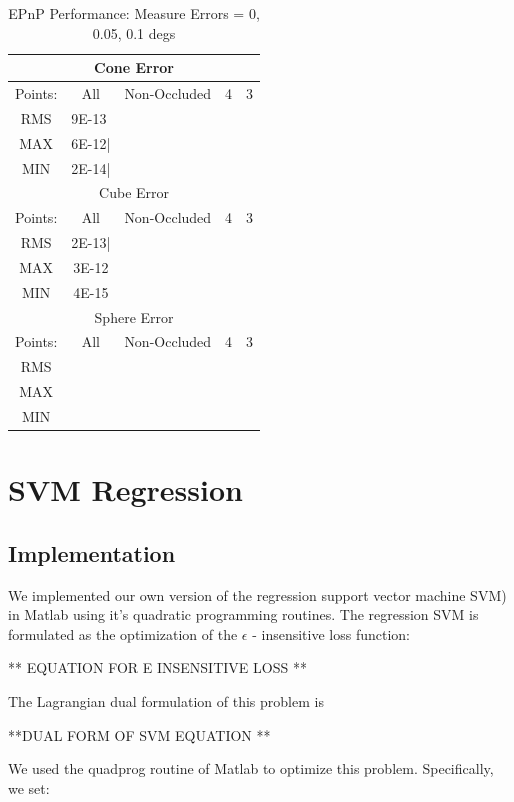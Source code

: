 \documentclass[journal]{IEEEtran}
\begin{document}
 

\begin{table}[h]
	\caption{EPnP Performance: Measure Errors = 0, 0.05, 0.1 degs }
	\label{EPnP_Table}
	\centering
	\begin{tabular}{|c|c|c|c|c|}
		
		\hline
		\multicolumn{5}{|c|}{Cone Error} \\
		\hline
		Points: & All & Non-Occluded & 4 & 3\\
		\hline
		RMS & \multicolumn{1}{|l|}{9E-13}  &  &  &\\
		MAX & 6E-12| & &  &\\
		MIN & 2E-14| & &  &\\
		\hline
		\multicolumn{5}{|c|}{Cube Error} \\
		\hline
		Points: & All & Non-Occluded & 4 & 3\\
		\hline
		RMS & 2E-13| &  &  &\\
		MAX & 3E-12 & &  &\\
		MIN & 4E-15 & &  &\\
		\hline
		\multicolumn{5}{|c|}{Sphere Error} \\
		\hline
		Points: & All & Non-Occluded & 4 & 3\\
		\hline
		RMS &  &  & &\\
		MAX &  & &  &\\
		MIN & & &  &\\
		\hline
		
		
	\end{tabular}
\end{table}

\section{SVM Regression}

\subsection{Implementation}
We implemented our own version of the regression support vector machine SVM) in Matlab using it's quadratic programming routines. The regression SVM is formulated as the optimization of the $\epsilon$ - insensitive loss function:

** EQUATION FOR E INSENSITIVE LOSS **

The Lagrangian dual formulation of this problem is

**DUAL FORM OF SVM EQUATION **

We used the quadprog routine of Matlab to optimize this problem. Specifically, we set:
\end{document}

